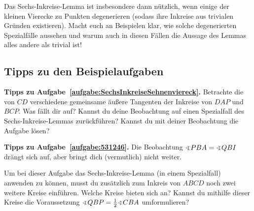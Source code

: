 Das Sechs-Inkreise-Lemma ist insbesondere dann nützlich, wenn einige der kleinen Vierecke zu Punkten degenerieren (sodass ihre Inkreise aus trivialen Gründen existieren). Macht euch an Beispielen klar, wie solche degenerierten Spezialfälle aussehen und warum auch in diesen Fällen die Aussage des Lemmas alles andere als trivial ist!

\subsection*{Tipps zu den Beispielaufgaben}
\textbf{Tipps zu Aufgabe~\ref{aufgabe:SechsInkreiseSehnenviereck}.} Betrachte die von $CD$ verschiedene gemeinsame äußere Tangenten der Inkreise von $DAP$ und $BCP$. Was fällt dir auf? Kannst du deine Beobachtung auf einen Spezialfall des Sechs-Inkreise-Lemmas zurückführen? Kannst du mit deiner Beobachtung die Aufgabe lösen?

\textbf{Tipps zu Aufgabe~\ref{aufgabe:531246}.} Die Beobachtung $\winkel PBA=\winkel QBI$ drängt sich auf, aber bringt dich (vermutlich) nicht weiter.

Um bei dieser Aufgabe das Sechs-Inkreise-Lemma (in einem Spezialfall) anwenden zu können, musst du zusätzlich zum Inkreis von $ABCD$ noch zwei weitere Kreise einführen. Welche Kreise bieten sich an? Kannst du mithilfe dieser Kreise die Voraussetzung $\winkel QBP=\frac12\winkel CBA$ umformulieren?